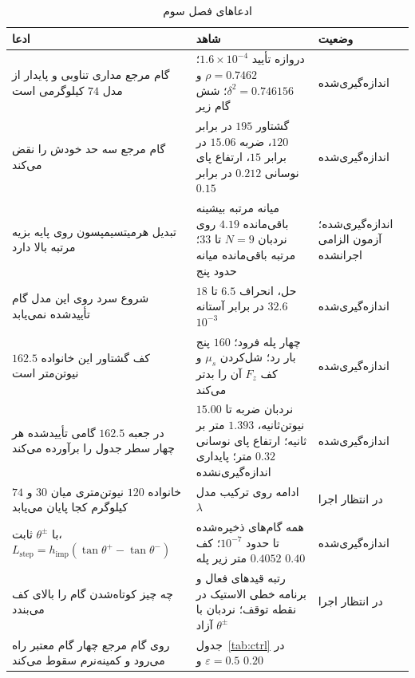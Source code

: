 \documentclass[10pt,twocolumn]{article}
\newcommand{\en}[1]{\lr{#1}}
\newcommand{\nd}{\lr{\textendash}}
\begin{document}
\begin{table}[!t]
    \centering
    \caption{ادعاهای فصل سوم}
    \label{tab:claims3}
    \small
    \begin{tabular}{p{}p{}p{}}
        \toprule
        ادعا & شاهد & وضعیت \\
        \midrule
        گام مرجع مداری تناوبی و پایدار از مدل $74$ کیلوگرمی است &
            دروازه تأیید $1.6\times10^{-4}$؛ $\rho=0.7462$ و $\delta^2=0.746156$؛ شش گام زیر \en{PD} &
            اندازه‌گیری‌شده \\
        گام مرجع سه حد خودش را نقض می‌کند &
            گشتاور $195$ در برابر $120$، ضربه $15.06$ در برابر $15$، ارتفاع پای نوسانی $0.212$ در برابر $0.15$ &
            اندازه‌گیری‌شده \\
        تبدیل هرمیت\nd{}سیمپسون روی پایه بزیه مرتبه بالا دارد &
            میانه مرتبه بیشینه باقی‌مانده $4.19$ روی نردبان $N=9$ تا $33$؛ مرتبه باقی‌مانده میانه حدود پنج &
            اندازه‌گیری‌شده؛ آزمون الزامی اجرانشده \\
        شروع سرد روی این مدل گام تأییدشده نمی‌یابد &
            $18$ حل، انحراف $6.5$ تا $32.6$ در برابر آستانه $10^{-3}$ &
            اندازه‌گیری‌شده \\
        کف گشتاور این خانواده $162.5$ نیوتن‌متر است &
            چهار پله فرود؛ $160$ پنج بار رد؛ شل‌کردن $\mu_s$ و کف $F_z$ آن را بدتر می‌کند &
            اندازه‌گیری‌شده \\
        در جعبه $162.5$ گامی تأییدشده هر چهار سطر جدول \en{3.1} را برآورده می‌کند &
            نردبان ضربه تا $15.00$ نیوتن‌ثانیه، $1.393$ متر بر ثانیه؛ ارتفاع پای نوسانی $0.32$ متر؛ پایداری اندازه‌گیری‌نشده &
            اندازه‌گیری‌شده \\
        خانواده $120$ نیوتن‌متری میان $30$ و $74$ کیلوگرم کجا پایان می‌یابد &
            ادامه روی ترکیب مدل $\lambda$ &
            در انتظار اجرا \\
        با $\theta^\pm$ ثابت، $L_{\mathrm{step}}=h_{\mathrm{imp}}(\tan\theta^+-\tan\theta^-)$ &
            همه گام‌های ذخیره‌شده تا حدود $10^{-7}$؛ کف $0.4052$ متر زیر پله $0.40$ &
            اندازه‌گیری‌شده \\
        چه چیز کوتاه‌شدن گام را بالای کف می‌بندد &
            رتبه قیدهای فعال و برنامه خطی الاستیک در نقطه توقف؛ نردبان با $\theta^\pm$ آزاد &
            در انتظار اجرا \\
        روی گام مرجع \en{PD} چهار گام معتبر راه می‌رود و \en{CLF-QP} کمینه‌نرم سقوط می‌کند &
            جدول~\ref{tab:ctrl} در $\varepsilon=0.5$ و $0.20$ &

\end{tabular}
\end{table}
\end{document}
